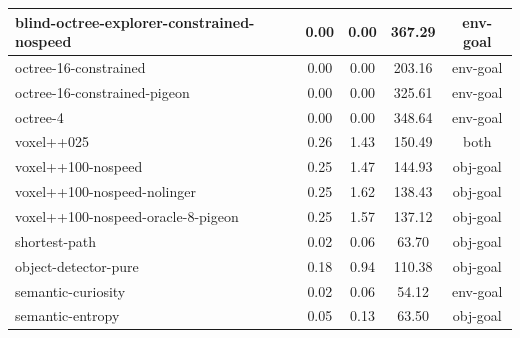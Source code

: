 \begin{longtable}{|l|c|c|c|c|}
{\cellcolor[HTML]{D7C5AF}} \color[HTML]{000000}         blind-octree-explorer-constrained-nospeed & 0.00 & 0.00 & 367.29 &      {\cellcolor[HTML]{D7C5AF}} \color[HTML]{000000}    env-goal \\ \hline
{\cellcolor[HTML]{D7C5AF}} \color[HTML]{000000}         octree-16-constrained & 0.00 & 0.00 & 203.16 &              {\cellcolor[HTML]{D7C5AF}} \color[HTML]{000000}    env-goal \\ \hline
{\cellcolor[HTML]{D7C5AF}} \color[HTML]{000000}         octree-16-constrained-pigeon & 0.00 & 0.00 & 325.61 &       {\cellcolor[HTML]{D7C5AF}} \color[HTML]{000000}   env-goal \\ \hline
{\cellcolor[HTML]{D7C5AF}} \color[HTML]{000000}         octree-4 & 0.00 & 0.00 & 348.64 &                           {\cellcolor[HTML]{D7C5AF}} \color[HTML]{000000}   env-goal \\ \hline
{\cellcolor[HTML]{B5C3D7}} \color[HTML]{000000}         voxel++025 & 0.26 & 1.43 & 150.49 &                         {\cellcolor[HTML]{B5C3D7}} \color[HTML]{000000} both \\ \hline
{\cellcolor[HTML]{C4D7B8}} \color[HTML]{000000}         voxel++100-nospeed & 0.25 & 1.47 & 144.93 &                 {\cellcolor[HTML]{C4D7B8}} \color[HTML]{000000} obj-goal \\ \hline
{\cellcolor[HTML]{C4D7B8}} \color[HTML]{000000}         voxel++100-nospeed-nolinger & 0.25 & 1.62 & 138.43 &        {\cellcolor[HTML]{C4D7B8}} \color[HTML]{000000} obj-goal \\ \hline
{\cellcolor[HTML]{C4D7B8}} \color[HTML]{000000}         voxel++100-nospeed-oracle-8-pigeon & 0.25 & 1.57 & 137.12 & {\cellcolor[HTML]{C4D7B8}} \color[HTML]{000000} obj-goal \\ \hline
{\cellcolor[HTML]{C4D7B8}} \color[HTML]{000000}         shortest-path & 0.02 & 0.06 & 63.70 &                       {\cellcolor[HTML]{C4D7B8}} \color[HTML]{000000} obj-goal \\ \hline
{\cellcolor[HTML]{C4D7B8}} \color[HTML]{000000}         object-detector-pure & 0.18 & 0.94 & 110.38 &               {\cellcolor[HTML]{C4D7B8}} \color[HTML]{000000} obj-goal \\ \hline
{\cellcolor[HTML]{D7C5AF}} \color[HTML]{000000}         semantic-curiosity & 0.02 & 0.06 & 54.12 &                  {\cellcolor[HTML]{D7C5AF}} \color[HTML]{000000}     env-goal \\ \hline
{\cellcolor[HTML]{C4D7B8}} \color[HTML]{000000}         semantic-entropy & 0.05 & 0.13 & 63.50 &                    {\cellcolor[HTML]{C4D7B8}} \color[HTML]{000000} obj-goal \\ \hline

\end{longtable}
